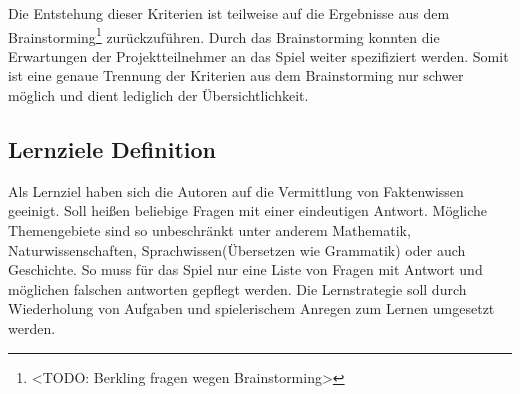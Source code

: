	Die Entstehung dieser Kriterien ist teilweise auf die Ergebnisse aus dem Brainstorming\footnote{<TODO: Berkling fragen wegen Brainstorming>} zurückzuführen. Durch das Brainstorming konnten die Erwartungen der Projektteilnehmer an das Spiel weiter spezifiziert werden. Somit ist eine genaue Trennung der Kriterien aus dem Brainstorming nur schwer möglich und dient lediglich der Übersichtlichkeit.

\subsection{Lernziele Definition}\label{ssec:lern-def}
	Als Lernziel haben sich die Autoren auf die Vermittlung von Faktenwissen geeinigt. Soll heißen beliebige Fragen mit einer eindeutigen Antwort. Mögliche Themengebiete sind so unbeschränkt unter anderem Mathematik, Naturwissenschaften, Sprachwissen(Übersetzen wie Grammatik) oder auch Geschichte. So muss für das Spiel nur eine Liste von Fragen mit Antwort und möglichen falschen antworten gepflegt werden.
	Die Lernstrategie soll durch Wiederholung von Aufgaben und spielerischem Anregen zum Lernen umgesetzt werden.

